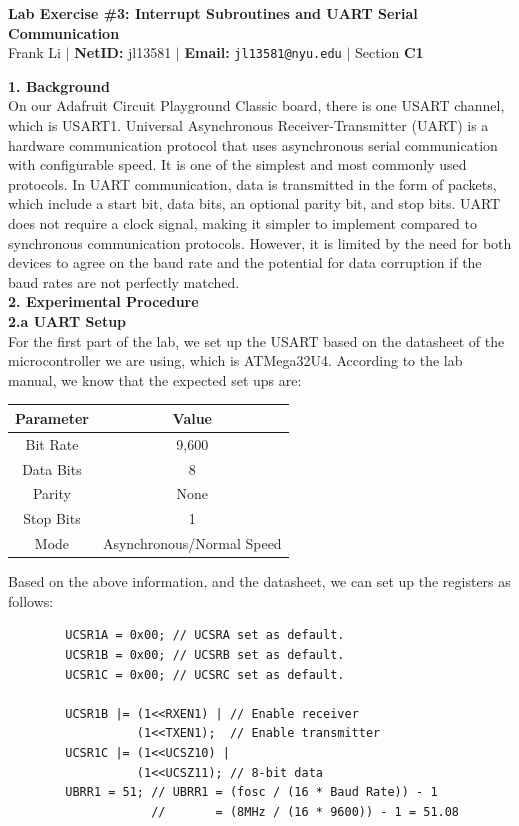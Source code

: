 \documentclass{report}
\begin{document}
\begin{center}
    \textbf{\huge Lab Exercise \#3: Interrupt Subroutines and UART Serial Communication} \\[1em]
    Frank Li $|$
    \textbf{NetID:} jl13581 $|$
    \textbf{Email:} \texttt{jl13581@nyu.edu} $|$
    Section \textbf{C1} \\ [1em]
\end{center}
    {\Large \textbf{1. Background}}\\[0.5em]
    On our Adafruit Circuit Playground Classic board, there is one USART channel, which is USART1. Universal Asynchronous Receiver-Transmitter (UART) is a hardware communication protocol that uses asynchronous serial communication with configurable speed. It is one of the simplest and most commonly used protocols. In UART communication, data is transmitted in the form of packets, which include a start bit, data bits, an optional parity bit, and stop bits. UART does not require a clock signal, making it simpler to implement compared to synchronous communication protocols. However, it is limited by the need for both devices to agree on the baud rate and the potential for data corruption if the baud rates are not perfectly matched.\\[1em]
    {\Large \textbf{2. Experimental Procedure}}\\[0.5em]
    {\Large \textbf{2.a UART Setup}}\\[0.5em]
    For the first part of the lab, we set up the USART based on the datasheet of the microcontroller we are using, which is ATMega32U4. According to the lab manual, we know that the expected set ups are:
    \begin{center}
        \begin{tabular}{|c|c|}
        \hline
        \textbf{Parameter} & \textbf{Value} \\
        \hline
        Bit Rate & 9,600 \\
        \hline
        Data Bits & 8 \\
        \hline
        Parity & None \\
        \hline
        Stop Bits & 1 \\
        \hline
        Mode & Asynchronous/Normal Speed \\
        \hline
        \end{tabular}
    \end{center}
    Based on the above information, and the datasheet, we can set up the registers as follows:
    \begin{verbatim}
        UCSR1A = 0x00; // UCSRA set as default. 
        UCSR1B = 0x00; // UCSRB set as default.
        UCSR1C = 0x00; // UCSRC set as default.
    
        UCSR1B |= (1<<RXEN1) | // Enable receiver
                  (1<<TXEN1);  // Enable transmitter
        UCSR1C |= (1<<UCSZ10) |
                  (1<<UCSZ11); // 8-bit data
        UBRR1 = 51; // UBRR1 = (fosc / (16 * Baud Rate)) - 1
                    //       = (8MHz / (16 * 9600)) - 1 = 51.08 
    \end{verbatim}
\end{document}
